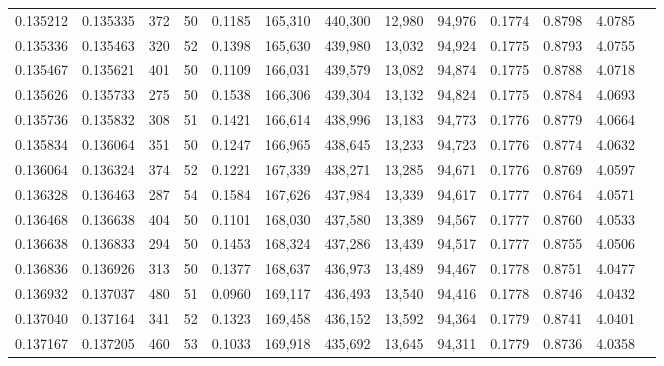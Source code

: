 \begin{tabular}{rrrrrrrrrrrrr}
0.135212 & 0.135335 &   372 &  50 &                                     0.1185 & 165,310 & 440,300 &  12,980 &  94,976 & 0.1774 & 0.8798 & 4.0785 \\
0.135336 & 0.135463 &   320 &  52 &                                     0.1398 & 165,630 & 439,980 &  13,032 &  94,924 & 0.1775 & 0.8793 & 4.0755 \\
0.135467 & 0.135621 &   401 &  50 &                                     0.1109 & 166,031 & 439,579 &  13,082 &  94,874 & 0.1775 & 0.8788 & 4.0718 \\
0.135626 & 0.135733 &   275 &  50 &                                     0.1538 & 166,306 & 439,304 &  13,132 &  94,824 & 0.1775 & 0.8784 & 4.0693 \\
0.135736 & 0.135832 &   308 &  51 &                                     0.1421 & 166,614 & 438,996 &  13,183 &  94,773 & 0.1776 & 0.8779 & 4.0664 \\
0.135834 & 0.136064 &   351 &  50 &                                     0.1247 & 166,965 & 438,645 &  13,233 &  94,723 & 0.1776 & 0.8774 & 4.0632 \\
0.136064 & 0.136324 &   374 &  52 &                                     0.1221 & 167,339 & 438,271 &  13,285 &  94,671 & 0.1776 & 0.8769 & 4.0597 \\
0.136328 & 0.136463 &   287 &  54 &                                     0.1584 & 167,626 & 437,984 &  13,339 &  94,617 & 0.1777 & 0.8764 & 4.0571 \\
0.136468 & 0.136638 &   404 &  50 &                                     0.1101 & 168,030 & 437,580 &  13,389 &  94,567 & 0.1777 & 0.8760 & 4.0533 \\
0.136638 & 0.136833 &   294 &  50 &                                     0.1453 & 168,324 & 437,286 &  13,439 &  94,517 & 0.1777 & 0.8755 & 4.0506 \\
0.136836 & 0.136926 &   313 &  50 &                                     0.1377 & 168,637 & 436,973 &  13,489 &  94,467 & 0.1778 & 0.8751 & 4.0477 \\
0.136932 & 0.137037 &   480 &  51 &                                     0.0960 & 169,117 & 436,493 &  13,540 &  94,416 & 0.1778 & 0.8746 & 4.0432 \\
0.137040 & 0.137164 &   341 &  52 &                                     0.1323 & 169,458 & 436,152 &  13,592 &  94,364 & 0.1779 & 0.8741 & 4.0401 \\
0.137167 & 0.137205 &   460 &  53 &                                     0.1033 & 169,918 & 435,692 &  13,645 &  94,311 & 0.1779 & 0.8736 & 4.0358 \\

\end{tabular}
